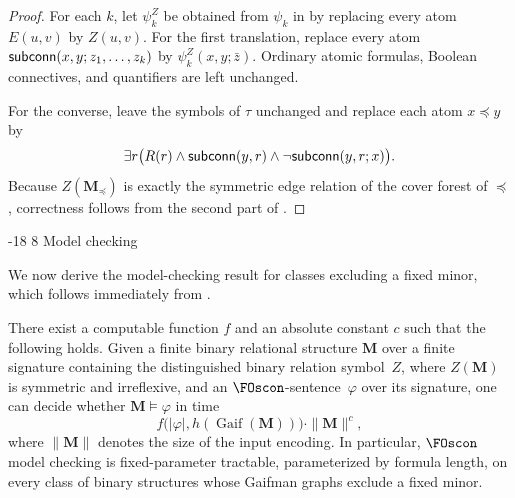 \documentclass[1p,number,11pt]{elsarticle}
\makeatletter
\renewcommand\subsection{\@startsection{subsection}{2}{\z@}%
  {-18\p@ \@plus -4\p@ \@minus -4\p@}%
  {8\p@ \@plus 4\p@ \@minus 4\p@}%
  {\normalfont\normalsize\bfseries}}
\newcommand{\scon}{\hbox{\sf subconn}}
\newcommand{\Gaif}{\operatorname{Gaif}}
\theoremstyle{plain}
\makeatother
\begin{document}
\begin{proof}
For each $k$, let $\psi_k^Z$ be obtained from $\psi_k$ in
 by replacing every atom $E(u,v)$ by $Z(u,v)$.
For the first translation, replace every atom
$\scon(x,y;z_1,\ldots,z_k)$ by $\psi_k^Z(x,y;\bar z)$. Ordinary
atomic formulas, Boolean connectives, and quantifiers are left unchanged.

For the converse, leave the symbols of $\tau$ unchanged and replace each
atom $x\preceq y$ by
\[
   \exists r\bigl(
      R(r)
      \wedge \scon(y,r)
      \wedge \neg\scon(y,r;x)
   \bigr).
\]
Because $Z(\mathbf M_\preceq)$ is exactly the symmetric edge relation of the
cover forest of $\preceq$, correctness follows from the second part of
.
\end{proof}


\subsection{Model checking}\label{sec-MC}

We now derive the model-checking result for classes excluding a fixed minor, which follows immediately from .

\begin{theorem}[store=thm:main-mc,
    restate-keys={note=see \zcpageref[nocap]{thm:main-mc}}]
There exist a computable function $f$ and an absolute constant $c$ such that
the following holds. Given a finite binary relational structure $\mathbf M$
over a finite signature containing the distinguished binary relation
symbol~$Z$, where $Z(\mathbf M)$ is symmetric and irreflexive, and an
$\FOscon$-sentence~$\varphi$ over its signature, one can decide whether
$\mathbf M\models\varphi$ in time
\[
   f\bigl(|\varphi|,h(\Gaif(\mathbf M))\bigr)\cdot\|\mathbf M\|^c,
\]
where $\|\mathbf M\|$ denotes the size of the input encoding. In particular,
$\FOscon$ model checking is fixed-parameter tractable, parameterized by formula length, on every class of binary structures whose Gaifman graphs exclude a
fixed minor.
\end{theorem}
\end{document}
